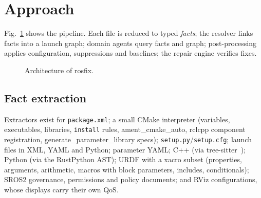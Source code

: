 ﻿\documentclass[conference]{IEEEtran}
\newcommand{\tool}{\textsf{rosfix}}
\newcommand{\code}[1]{\texttt{#1}}
\begin{document}
\section{Approach}

Fig.~\ref{fig:arch} shows the pipeline. Each file is reduced to typed \emph{facts}; the
resolver links facts into a launch graph; domain agents query facts and graph; post-processing
applies configuration, suppressions and baselines; the repair engine verifies fixes.

\begin{figure}[t]
\centering
{}
\caption{Architecture of \tool.}
\label{fig:arch}
\end{figure}

\subsection{Fact extraction}

Extractors exist for \code{package.xml}; a small CMake interpreter (variables, executables,
libraries, \code{install} rules, ament\_cmake\_auto, rclcpp component registration,
generate\_parameter\_library specs); \code{setup.py}/\code{setup.cfg}; launch files in XML,
YAML and Python; parameter YAML; C++ (via tree-sitter~\cite{treesitter}); Python (via the
RustPython AST); URDF with a xacro subset (properties, arguments, arithmetic, macros with block
parameters, includes, conditionals); SROS2 governance, permissions and policy documents; and
RViz configurations, whose displays carry their own QoS.
\end{document}
